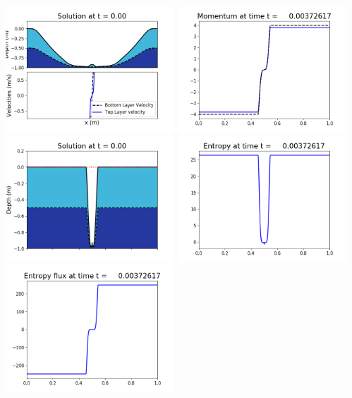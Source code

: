 \documentclass[11pt]{article}
\begin{document}
\includegraphics[width=0.475\textwidth]{frame0024fig1002.png}
\vskip 10pt 
\includegraphics[width=0.475\textwidth]{frame0024fig1003.png}
\includegraphics[width=0.475\textwidth]{frame0024fig1006.png}
\vskip 10pt 
\includegraphics[width=0.475\textwidth]{frame0024fig1007.png}
\includegraphics[width=0.475\textwidth]{frame0024fig1008.png}
\end{document}
